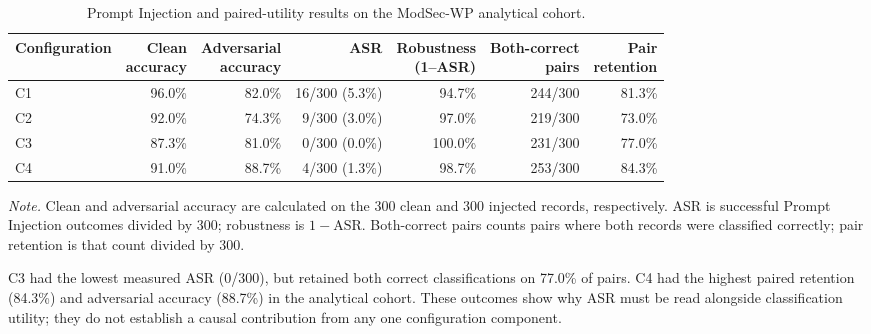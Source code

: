 \begin{table}[H]
\centering
\caption{Prompt Injection and paired-utility results on the ModSec-WP analytical cohort.}
\label{tab:modsec-pi-results}
{\small
\setlength{\tabcolsep}{4pt}
\begin{tabular}{@{}lrrrrrr@{}}
\toprule
Configuration & \shortstack{Clean\\accuracy} &
\shortstack{Adversarial\\accuracy} & ASR &
\shortstack{Robustness\\(1--ASR)} &
\shortstack{Both-correct\\pairs} &
\shortstack{Pair\\retention} \\
\midrule
C1 & 96.0\% & 82.0\% & 16/300 (5.3\%) & 94.7\% & 244/300 & 81.3\% \\
C2 & 92.0\% & 74.3\% & 9/300 (3.0\%) & 97.0\% & 219/300 & 73.0\% \\
C3 & 87.3\% & 81.0\% & 0/300 (0.0\%) & 100.0\% & 231/300 & 77.0\% \\
C4 & 91.0\% & 88.7\% & 4/300 (1.3\%) & 98.7\% & 253/300 & 84.3\% \\
\bottomrule
\end{tabular}
}
\par\smallskip
\begin{minipage}{\textwidth}\footnotesize
\textit{Note.} Clean and adversarial accuracy are calculated on the 300
clean and 300 injected records, respectively. ASR is successful
Prompt Injection outcomes divided by 300; robustness is \(1-\mathrm{ASR}\).
Both-correct pairs counts pairs where both records were classified
correctly; pair retention is that count divided by 300.
\end{minipage}
\end{table}

C3 had the lowest measured ASR (0/300), but retained both correct
classifications on 77.0\% of pairs. C4 had the highest paired
retention (84.3\%) and adversarial accuracy (88.7\%) in the analytical
cohort. These outcomes show why ASR must be read alongside
classification utility; they do not establish a causal contribution
from any one configuration component.

